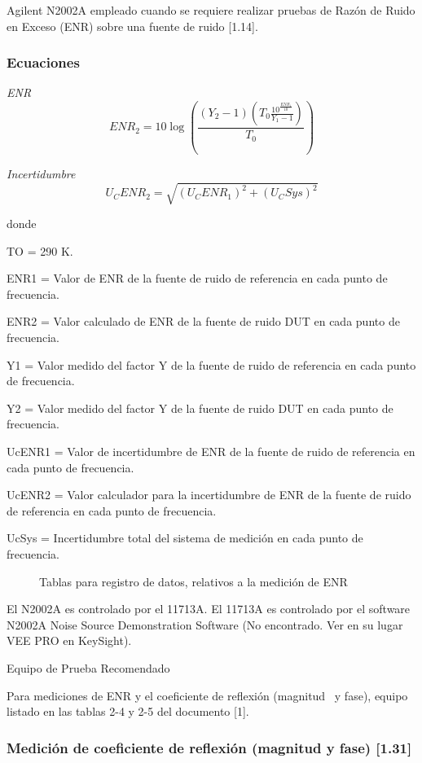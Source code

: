 Agilent N2002A empleado cuando se requiere realizar pruebas de Razón de Ruido en Exceso (ENR) sobre una fuente de ruido [1.14]. 

\subsubsection{Ecuaciones}
\emph{ENR}
\begin{equation}
	ENR_2 = 10\log\left(\frac{\left(Y_2-1\right)\left(T_0\frac{10^\frac{ENR_1}{10}}{Y_1-1}\right)}{T_0}\right)
\end{equation}

\emph{Incertidumbre}
\begin{equation}
	U_{C}ENR_2=\sqrt{(U_{C}ENR_1)^2+(U_{C}Sys)^2}
\end{equation}

donde

TO = 290 K.

ENR1 = Valor de ENR de la fuente de ruido de referencia en cada punto de frecuencia.

ENR2 = Valor calculado de ENR de la fuente de ruido DUT en cada punto de frecuencia.

Y1 = Valor medido del factor Y de la fuente de ruido de referencia en cada punto de frecuencia.

Y2 = Valor medido del factor Y de la fuente de ruido DUT en cada punto de frecuencia.

UcENR1 = Valor de incertidumbre de ENR de la fuente de ruido de referencia en cada punto de frecuencia.

UcENR2 = Valor calculador para la incertidumbre de ENR de la fuente de ruido de referencia en cada punto de frecuencia.

UcSys = Incertidumbre total del sistema de medición en cada punto de frecuencia.

	
\begin{figure}[h!]
\centering
 Tablas para registro
	de datos, relativos a la medición de ENR
\end{figure}

El N2002A es controlado por el 11713A. El 11713A es controlado por el software N2002A Noise Source Demonstration Software (No encontrado. Ver en su lugar VEE PRO en KeySight).

Equipo de Prueba Recomendado

Para mediciones de ENR y el coeficiente de reflexión (magnitud \ y fase), equipo listado en las tablas 2-4 y 2-5 del
documento [1].		

\subsubsection{Medición de coeficiente de reflexión (magnitud y fase) [1.31]}
